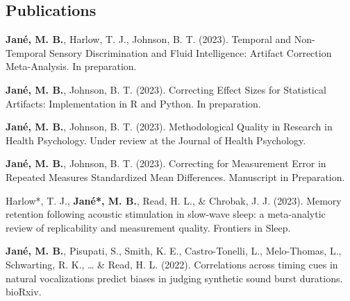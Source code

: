 \documentclass[
  letterpaper,
  DIV=11,
  numbers=noendperiod]{scrartcl}
\begin{document}
\hypertarget{publications}{%
\subsection{Publications}\label{publications}}

\textbf{Jané, M. B.}, Harlow, T. J., Johnson, B. T. (2023). Temporal and
Non-Temporal Sensory Discrimination and Fluid Intelligence: Artifact
Correction Meta-Analysis. In preparation.

\textbf{Jané, M. B.}, Johnson, B. T. (2023). Correcting Effect Sizes for
Statistical Artifacts: Implementation in R and Python. In preparation.

\textbf{Jané, M. B.}, Johnson, B. T. (2023). Methodological Quality in
Research in Health Psychology. Under review at the Journal of Health
Psychology.

\textbf{Jané, M. B.}, Johnson, B. T. (2023). Correcting for Measurement
Error in Repeated Measures Standardized Mean Differences. Manuscript in
Preparation.

Harlow*, T. J., \textbf{Jané*, M. B.}, Read, H. L., \& Chrobak, J. J.
(2023). Memory retention following acoustic stimulation in slow-wave
sleep: a meta-analytic review of replicability and measurement quality.
Frontiers in Sleep.

\textbf{Jané, M. B.}, Pisupati, S., Smith, K. E., Castro-Tonelli, L.,
Melo-Thomas, L., Schwarting, R. K., \ldots{} \& Read, H. L. (2022).
Correlations across timing cues in natural vocalizations predict biases
in judging synthetic sound burst durations. bioRxiv.
\end{document}

